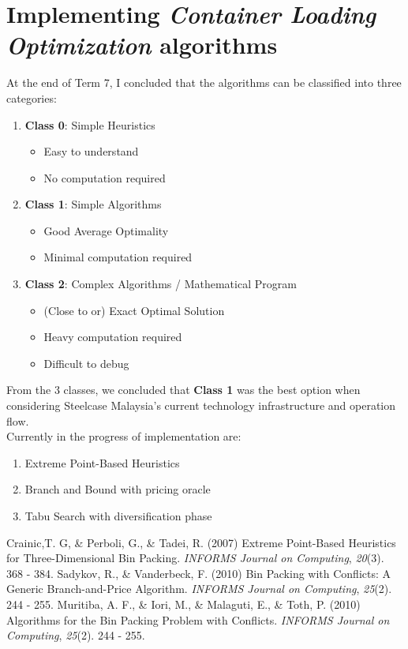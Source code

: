 \documentclass[a4paper, 11pt]{article}
\begin{document}
\pagebreak

\section*{Implementing \textit{Container Loading Optimization} algorithms}

At the end of Term 7, I concluded that the algorithms can be classified into three categories:
\begin{enumerate}[label=\arabic*)]
\item \textbf{Class 0}: Simple Heuristics\begin{itemize}
\item Easy to understand
\item No computation required
\end{itemize}
\item \textbf{Class 1}: Simple Algorithms\begin{itemize}
\item Good Average Optimality
\item Minimal computation required
\end{itemize}
\item \textbf{Class 2}: Complex Algorithms / Mathematical Program\begin{itemize}
\item (Close to or) Exact Optimal Solution
\item Heavy computation required
\item Difficult to debug
\end{itemize}
\end{enumerate}

From the 3 classes, we concluded that \textbf{Class 1} was the best option when considering Steelcase Malaysia's current technology infrastructure and operation flow.\\

Currently in the progress of implementation are:\begin{enumerate}
\item Extreme Point-Based Heuristics\cite{Extreme}
\item Branch and Bound with pricing oracle\cite{Bnb}
\item Tabu Search with diversification phase\cite{Tabu}
\end{enumerate}

\begin{thebibliography}{9}
 Crainic,T. G, \& Perboli, G., \& Tadei, R. (2007) Extreme Point-Based Heuristics for Three-Dimensional Bin Packing. \emph{INFORMS Journal on Computing}, \emph{20}(3). 368 - 384.
  Sadykov, R., \& Vanderbeck, F. (2010) Bin Packing with Conflicts: A Generic Branch-and-Price Algorithm. \emph{INFORMS Journal on Computing}, \emph{25}(2). 244 - 255.
  Muritiba, A. F., \& Iori, M., \& Malaguti, E., \& Toth, P. (2010) Algorithms for the Bin Packing Problem with Conflicts. \emph{INFORMS Journal on Computing}, \emph{25}(2). 244 - 255.
\end{thebibliography}
\end{document}
